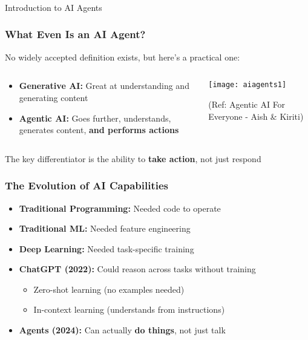 \begin{frame}[fragile]\frametitle{}
\begin{center}
{\Large Introduction to AI Agents}
\end{center}
\end{frame}

\begin{frame}[fragile]\frametitle{What Even Is an AI Agent?}
No widely accepted definition exists, but here's a practical one:

\begin{columns}
    \begin{column}[T]{0.6\linewidth}
		\begin{itemize}
			\item \textbf{Generative AI:} Great at understanding and generating content
			\item \textbf{Agentic AI:} Goes further, understands, generates content, \textbf{and performs actions}
		\end{itemize}

    \end{column}
    \begin{column}[T]{0.4\linewidth}
        \begin{center}
        \texttt{[image: aiagents1]}
		
		{\tiny (Ref: Agentic AI For Everyone - Aish \& Kiriti)}
        \end{center}
    \end{column}
  \end{columns}
  
The key differentiator is the ability to \textbf{take action}, not just respond  
\end{frame}

\begin{frame}[fragile]\frametitle{The Evolution of AI Capabilities}
\begin{itemize}
    \item \textbf{Traditional Programming:} Needed code to operate
    \item \textbf{Traditional ML:} Needed feature engineering
    \item \textbf{Deep Learning:} Needed task-specific training
    \item \textbf{ChatGPT (2022):} Could reason across tasks without training
    \begin{itemize}
        \item Zero-shot learning (no examples needed)
        \item In-context learning (understands from instructions)
    \end{itemize}
    \item \textbf{Agents (2024):} Can actually \textbf{do things}, not just talk
\end{itemize}
\end{frame}

